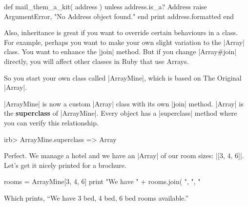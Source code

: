 \documentclass[12pt,twoside]{report}
\begin{document}
\begin{rubycode}

 def mail_them_a_kit( address )
   unless address.is_a? Address
     raise ArgumentError, "No Address object found."
   end
   print address.formatted
 end

\end{rubycode}


Also, inheritance is great if you want to override certain behaviours
in a class. For example, perhaps you want to make your own slight
variation to the \rubyinline|Array| class. You want to
enhance the \rubyinline|join| method.  But if you
change \rubyinline|Array#join| directly, you will
affect other classes in Ruby that use Arrays.

So you start your own class called
\rubyinline|ArrayMine|, which is based on The Original
\rubyinline|Array|.




\rubyinline|ArrayMine| is now a custom
\rubyinline|Array| class with its own
\rubyinline|join| method.
\rubyinline|Array| is the {\bf superclass} of
\rubyinline|ArrayMine|.  Every object has a
\rubyinline|superclass| method where you can verify
this relationship.


\begin{consolecode}

 irb> ArrayMine.superclass
   => Array

\end{consolecode}


Perfect.  We manage a hotel and we have an
\rubyinline|Array| of our room sizes:
\rubyinline|[3, 4, 6]|. Let's get it nicely printed
for a brochure.


\begin{rubycode}

 rooms = ArrayMine[3, 4, 6]
 print "We have " + rooms.join( ", ", "%

\end{rubycode}


Which prints, ``We have 3 bed, 4 bed, 6 bed rooms available.''
\end{document}
